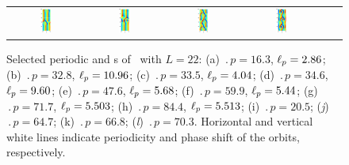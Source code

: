 \begin{figure}[t]
\begin{center}
\begin{tabular}{cccccc}
\includegraphics[width=0.15\textwidth]{figs/ks22rpo059.9-05.44.eps}\hspace{-3ex} &
\includegraphics[width=0.15\textwidth]{figs/ks22rpo084.4-05.51.eps}\hspace{-3ex} &
\includegraphics[width=0.15\textwidth]{figs/ks22rpo064.7-00.00.eps}\hspace{-3ex} &
\includegraphics[width=0.15\textwidth]{figs/ks22rpo070.3-00.00.eps}
\end{tabular}
\end{center}
\caption{Selected periodic and \rpo s of \KSe\ with $L = 22$:
(a) $\period{p} = 16.3$, $\ell_p = 2.86$;
(b) $\period{p} = 32.8$, $\ell_p = 10.96$;
(c) $\period{p} = 33.5$, $\ell_p = 4.04$;
(d) $\period{p} = 34.6$, $\ell_p = 9.60$;
(e) $\period{p} = 47.6$, $\ell_p = 5.68$;
(f) $\period{p} = 59.9$, $\ell_p = 5.44$;
(g) $\period{p} = 71.7$, $\ell_p = 5.503$;
(h) $\period{p} = 84.4$, $\ell_p = 5.513$;
(i) $\period{p} = 20.5$;  (\textit{j}) $\period{p} = 64.7$;
(k) $\period{p} = 66.8$;  (\textit{l}) $\period{p} = 70.3$.
Horizontal and vertical white lines indicate periodicity and phase
shift of the orbits, respectively.
}\label{f:ks22rpos}
\end{figure}


